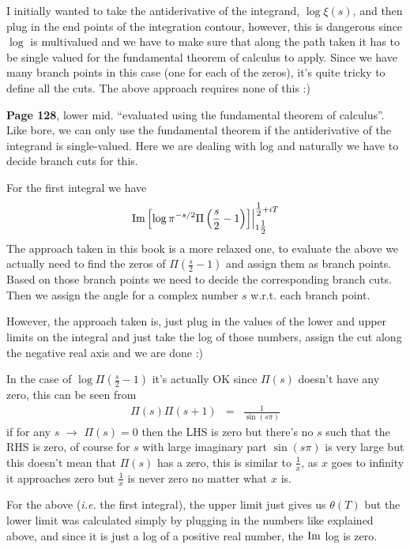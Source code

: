 \documentclass[aps,preprint,preprintnumbers,nofootinbib,showpacs,prd]{revtex4-1}
\newcommand{\ie}{{\it i.e.} }
\newcommand{\nbea}{\begin{eqnarray*}}
\newcommand{\neea}{\end{eqnarray*}}
\def\Im{{\rm Im}}
\begin{document}
I initially wanted to take the antiderivative of the integrand, $\log \xi(s)$, and then plug in the end points of the integration contour, however, this is dangerous since $\log$ is multivalued and we have to make sure that along the path taken it has to be single valued for the fundamental theorem of calculus to apply. Since we have many branch points in this case (one for each of the zeros), it's quite tricky to define all the cuts. The above approach requires none of this :)

{\bf Page 128}, lower mid. ``evaluated using the fundamental theorem of calculus''. Like bore, we can only use the fundamental theorem if the antiderivative of the integrand is single-valued. Here we are dealing with log and naturally we have to decide branch cuts for this.

For the first integral we have 
%
\nbea
\left.\Im\left\lbrack \log \pi^{-s/2} \Pi\left(\frac{s}{2} - 1\right)\right\rbrack\right|_{1\tfrac{1}{2}}^{\tfrac{1}{2} + iT}
\neea
%
The approach taken in this book is a more relaxed one, to evaluate the above we actually need to find the zeros of $\Pi\left(\frac{s}{2} - 1\right)$ and assign them as branch points. Based on those branch points we need to decide the corresponding branch cuts. Then we assign the angle for a complex number $s$ w.r.t. each branch point.

However, the approach taken is, just plug in the values of the lower and upper limits on the integral and just take the log of those numbers, assign the cut along the negative real axis and we are done :)

In the case of $\log \Pi(\tfrac{s}{2} - 1)$ it's actually OK since $\Pi(s)$ doesn't have any zero, this can be seen from
%
\nbea
\Pi(s) \Pi(s+1) & = & \frac{1}{\sin(s\pi)}
\neea
%
if for any $s$ $\to$ $\Pi(s) = 0$ then the LHS is zero but there's no $s$ such that the RHS is zero, of course for $s$ with large imaginary part $\sin(s\pi)$ is very large but this doesn't mean that $\Pi(s)$ has a zero, this is similar to $\tfrac{1}{x}$, as $x$ goes to infinity it approaches zero but $\tfrac{1}{x}$ is never zero no matter what $x$ is.

For the above (\ie the first integral), the upper limit just gives us $\theta(T)$ but the lower limit was calculated simply by plugging in the numbers like explained above, and since it is just a log of a positive real number, the $\Im$ log is zero.
\end{document}
